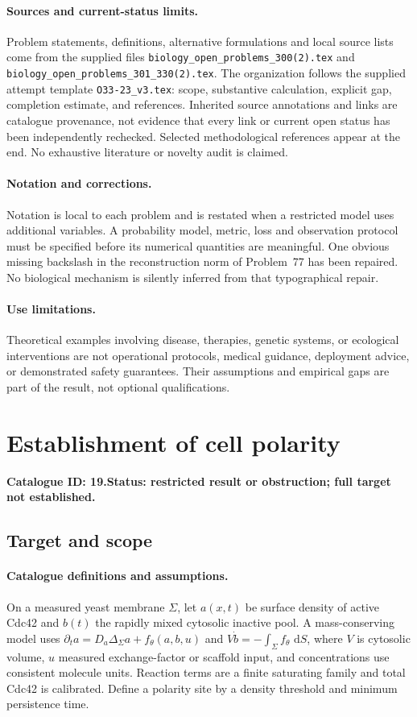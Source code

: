 \documentclass[11pt]{article}
\newcommand{\dd}{\,\mathrm d}
\begin{document}
\paragraph{Sources and current-status limits.}
Problem statements, definitions, alternative formulations and local source lists
come from the supplied files
\texttt{biology\_open\_problems\_300(2).tex} and
\texttt{biology\_open\_problems\_301\_330(2).tex}.
The organization follows the supplied attempt template
\texttt{O33-23\_v3.tex}: scope, substantive calculation, explicit gap,
completion estimate, and references. Inherited source annotations and links are
catalogue provenance, not evidence that every link or current open status has
been independently rechecked. Selected methodological references appear at the
end. No exhaustive literature or novelty audit is claimed.

\paragraph{Notation and corrections.}
Notation is local to each problem and is restated when a restricted model uses
additional variables. A probability model, metric, loss and observation protocol
must be specified before its numerical quantities are meaningful. One obvious
missing backslash in the reconstruction norm of Problem~77 has been repaired.
No biological mechanism is silently inferred from that typographical repair.

\paragraph{Use limitations.}
Theoretical examples involving disease, therapies, genetic systems, or ecological
interventions are not operational protocols, medical guidance, deployment advice,
or demonstrated safety guarantees. Their assumptions and empirical gaps are part
of the result, not optional qualifications.

\setcounter{section}{18}
\section{Establishment of cell polarity}
\label{prob:019}
\noindent\textbf{Catalogue ID: 19.}\quad \textbf{Status: restricted result or obstruction; full target not established.}
\subsection{Target and scope}
\paragraph{Catalogue definitions and assumptions.}
On a measured yeast membrane $\Sigma$, let $a(x,t)$ be surface density of active Cdc42 and $b(t)$ the rapidly mixed cytosolic inactive pool. A mass-conserving model uses $\partial_t a=D_a\Delta_\Sigma a+f_\theta(a,b,u)$ and $V\dot b=-\int_\Sigma f_\theta\,\dd S$, where $V$ is cytosolic volume, $u$ measured exchange-factor or scaffold input, and concentrations use consistent molecule units. Reaction terms are a finite saturating family and total Cdc42 is calibrated. Define a polarity site by a density threshold and minimum persistence time.
\end{document}
